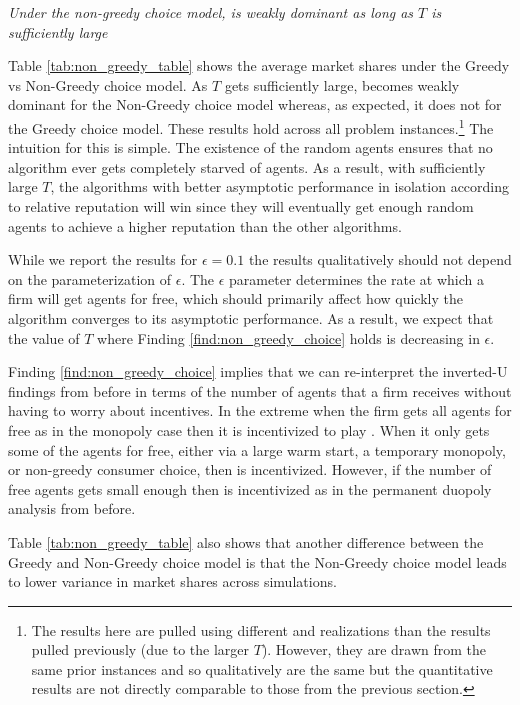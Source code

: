 \documentclass[../competing_bandits.tex]{subfiles}
\begin{document}
\normalsize


\begin{finding}\label{find:non_greedy_choice}
\textit{Under the non-greedy choice model, \TS is weakly dominant as long as $T$ is sufficiently large}
\end{finding}


Table \ref{tab:non_greedy_table} shows the average market shares under the Greedy vs Non-Greedy choice model. As $T$ gets sufficiently large, \TS becomes weakly dominant for the Non-Greedy choice model whereas, as expected, it does not for the Greedy choice model. These results hold across all problem instances.\footnote{The results here are pulled using different \MRV and realizations than the results pulled previously (due to the larger $T$). However, they are drawn from the same prior instances and so qualitatively are the same but the quantitative results are not directly comparable to those from the previous section.} The intuition for this is simple. The existence of the random agents ensures that no algorithm ever gets completely starved of agents. As a result, with sufficiently large $T$, the algorithms with better asymptotic performance in isolation according to relative reputation will win since they will eventually get enough random agents to achieve a higher reputation than the other algorithms.

While we report the results for $\epsilon = 0.1$ the results qualitatively should not depend on the parameterization of $\epsilon$. The $\epsilon$ parameter determines the rate at which a firm will get agents for free, which should primarily affect how quickly the algorithm converges to its asymptotic performance. As a result, we expect that the value of $T$ where Finding \ref{find:non_greedy_choice} holds is decreasing in $\epsilon$.

Finding \ref{find:non_greedy_choice} implies that we can re-interpret the inverted-U findings from before in terms of the number of agents that a firm receives without having to worry about incentives. In the extreme when the firm gets all agents for free as in the monopoly case then it is incentivized to play \DG. When it only gets some of the agents for free, either via a large warm start, a temporary monopoly, or non-greedy consumer choice, then \TS is incentivized. However, if the number of free agents gets small enough then \DG is incentivized as in the permanent duopoly analysis from before.

Table \ref{tab:non_greedy_table} also shows that another difference between the Greedy and Non-Greedy choice model is that the Non-Greedy choice model leads to lower variance in market shares across simulations.
\end{document}
